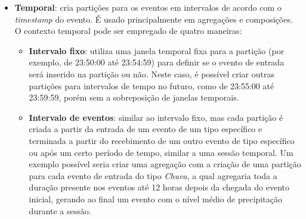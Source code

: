 \begin{itemize}
\item \textbf{Temporal}: cria partições para os eventos em intervalos de acordo com o \textit{timestamp} do evento. É usado principalmente em agregações e composições. O contexto temporal pode ser empregado de quatro maneiras:
\begin{itemize}
\item \textbf{Intervalo fixo}: 
utiliza uma janela temporal fixa para a partição (por exemplo, de 23:50:00 até 23:54:59) para definir se o evento de entrada será inserido na partição ou não. 
Neste caso, é possível criar outras partições para intervalos de tempo no futuro, como de 23:55:00 até 23:59:59, porém sem a sobreposição de janelas temporais.
\item \textbf{Intervalo de eventos}: similar ao intervalo fixo, mas cada partição é criada a partir da entrada de um evento de um tipo específico e terminada a partir do recebimento de um outro evento de tipo específico ou após um certo período de tempo, similar a uma sessão temporal. Um exemplo possível seria criar uma agregação com a criação de uma partição para cada evento de entrada do tipo \textit{Chuva}, a qual agregaria toda a duração presente nos eventos até 12 horas depois da chegada do evento inicial, gerando ao final um evento com o nível médio de precipitação durante a sessão.%


\end{itemize}
\end{itemize}
